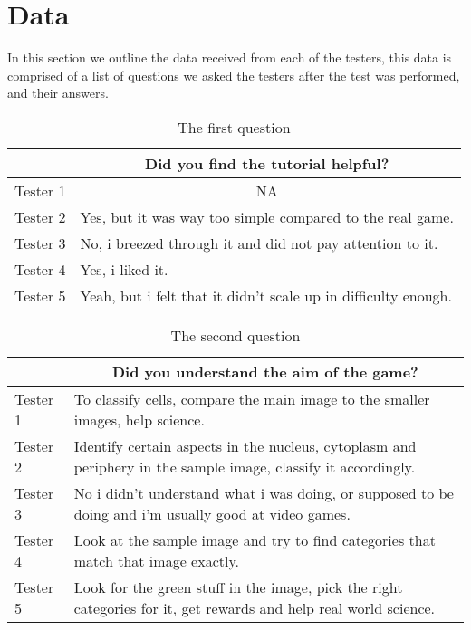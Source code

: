 \section{Data}\label{sec:data}
In this section we outline the data received from each of the testers, this data is comprised of a list of questions we asked the testers after the test was performed, and their answers.

\begin{table}[H]
\centering
\caption{The first question}
\label{tab:question1}
\begin{tabular}{p{1.3cm}p{10cm}}
\toprule
 & \multicolumn{1}{c}{Did you find the tutorial helpful?} \\ \midrule
Tester 1 & \multicolumn{1}{c}{NA} \\
Tester 2 & Yes, but it was way too simple compared to the real game. \\
Tester 3 & No, i breezed through it and did not pay attention to it. \\
Tester 4 & Yes, i liked it. \\
Tester 5 & Yeah, but i felt that it didn't scale up in difficulty enough. \\ \bottomrule
\end{tabular}
\end{table}

\begin{table}[H]
\centering
\caption{The second question}
\label{tab:question2}
\begin{tabular}{p{1.3cm}p{10cm}}
\toprule
 & \multicolumn{1}{c}{Did you understand the aim of the game?} \\ \midrule
Tester 1 & To classify cells, compare the main image to the smaller images, help science. \\
Tester 2 & Identify certain aspects in the nucleus, cytoplasm and periphery in the sample image, classify it accordingly. \\
Tester 3 & No i didn't understand what i was doing, or supposed to be doing and i'm usually good at video games. \\
Tester 4 & Look at the sample image and try to find categories that match that image exactly. \\
Tester 5 & Look for the green stuff in the image, pick the right categories for it, get rewards and help real world science. \\ \bottomrule
\end{tabular}
\end{table}

